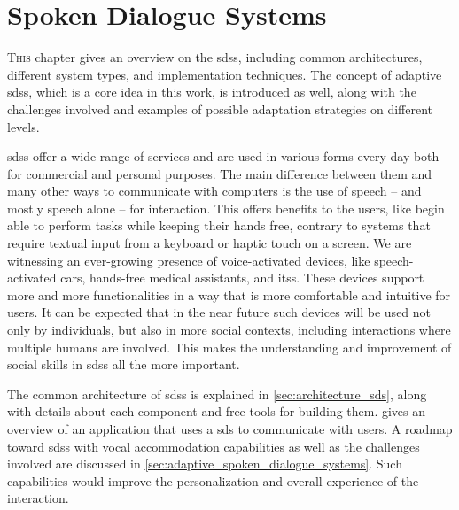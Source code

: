 \chapter{Spoken Dialogue Systems}
\label{chap:spoken_dialogue_systems}

\lettrine{T}{his} chapter gives an overview on the \aclp{sds}, including common architectures, different system types, and implementation techniques.
The concept of adaptive \aclp{sds}, which is a core idea in this work, is introduced as well, along with the challenges involved and examples of possible adaptation strategies on different levels.

\pagebreak


\noindent
\Acfp{sds} offer a wide range of services and are used in various forms every day both for commercial and personal purposes.
The main difference between them and many other ways to communicate with computers is the use of speech -- and mostly speech alone -- for interaction.
This offers benefits to the users, like begin able to perform tasks while keeping their hands free, contrary to systems that require textual input from a keyboard or haptic touch on a screen.
We are witnessing an ever-growing presence of voice-activated devices, like speech-activated cars, hands-free medical assistants, and \acp{its}.
These devices support more and more functionalities in a way that is more comfortable and intuitive for users.
It can be expected that in the near future such devices will be used not only by individuals, but also in more social contexts, including interactions where multiple humans are involved.
This makes the understanding and improvement of social skills in \acp{sds} all the more important.

The common architecture of \acp{sds} is explained in \cref{sec:architecture_sds}, along with details about each component and free tools for building them.
 gives an overview of an application that uses a \ac{sds} to communicate with users.
A roadmap toward \acp{sds} with vocal accommodation capabilities as well as the challenges involved are discussed in \cref{sec:adaptive_spoken_dialogue_systems}.
Such capabilities would improve the personalization and overall experience of the interaction.


